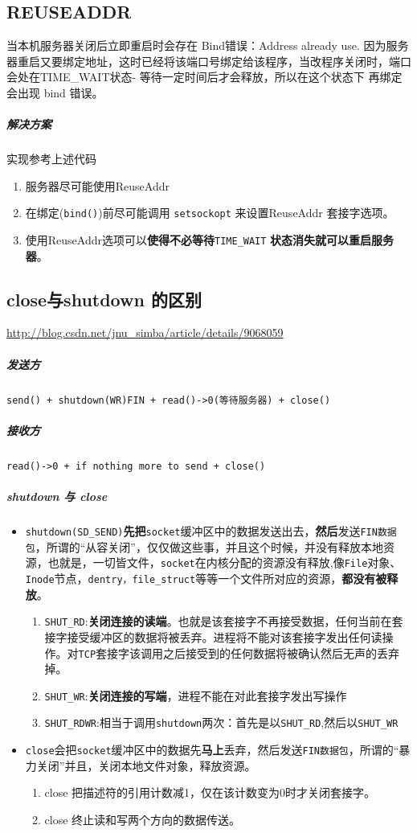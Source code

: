\documentclass[UTF8,a4paper,8pt]{ctexbook}
\begin{document}
		\subsection{REUSEADDR}
			当本机服务器关闭后立即重启时会存在 Bind错误：Address already use. 因为服务器重启又要绑定地址，这时已经将该端口号绑定给该程序，当改程序关闭时，端口会处在TIME\_WAIT状态- 等待一定时间后才会释放，所以在这个状态下 再绑定 会出现 bind 错误。
			
			\subparagraph{解决方案}实现参考上述代码
			
				\begin{enumerate}
					\item 服务器尽可能使用ReuseAddr
					\item 在绑定(\verb|bind()|)前尽可能调用 \verb|setsockopt| 来设置ReuseAddr 套接字选项。 
					\item 使用ReuseAddr选项可以\textbf{使得不必等待}\verb|TIME_WAIT| \textbf{状态消失就可以重启服务器}。
				\end{enumerate}
				
		\subsection{close与shutdown 的区别}
			\url{http://blog.csdn.net/jnu_simba/article/details/9068059}
			\subparagraph{发送方}
				\verb|send() + shutdown(WR)FIN + read()->0(等待服务器) + close()|
			\subparagraph{接收方}
				\verb|read()->0 + if nothing more to send + close()|
				
			\subparagraph{shutdown 与 close}
				\begin{itemize}[itemindent = 1em]
					\item \verb|shutdown(SD_SEND)|\textbf{先把}\verb|socket|缓冲区中的数据发送出去，\textbf{然后}发送\verb|FIN数据包|，所谓的“从容关闭”，仅仅做这些事，并且这个时候，并没有释放本地资源，也就是，一切皆文件，\verb|socket|在内核分配的资源没有释放,像\verb|File|对象、\verb|Inode|节点，\verb|dentry，file_struct|等等一个文件所对应的资源，\textbf{都没有被释放}。
						\begin{enumerate}[itemindent = 1em]
							\item \verb|SHUT_RD|:\textbf{关闭连接的读端}。也就是该套接字不再接受数据，任何当前在套接字接受缓冲区的数据将被丢弃。进程将不能对该套接字发出任何读操作。对\verb|TCP|套接字该调用之后接受到的任何数据将被确认然后无声的丢弃掉。
							\item \verb|SHUT_WR|:\textbf{关闭连接的写端}，进程不能在对此套接字发出写操作 
							\item \verb|SHUT_RDWR|:相当于调用\verb|shutdown|两次：首先是以\verb|SHUT_RD|,然后以\verb|SHUT_WR| 
						\end{enumerate}
					\item \verb|close|会把\verb|socket|缓冲区中的数据先\textbf{马上}丢弃，然后发送\verb|FIN数据包|，所谓的“暴力关闭”并且，关闭本地文件对象，释放资源。
						\begin{enumerate}[itemindent = 1em]
							\item close 把描述符的引用计数减1，仅在该计数变为0时才关闭套接字。
							\item close 终止读和写两个方向的数据传送。
						\end{enumerate}
				\end{itemize}
		
\end{document}
